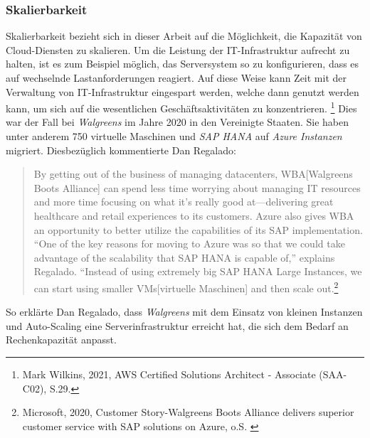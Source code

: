 \subsubsection{Skalierbarkeit}
Skalierbarkeit bezieht sich in dieser Arbeit auf die Möglichkeit, die Kapazität von Cloud-Diensten zu skalieren. Um die Leistung der IT-Infrastruktur aufrecht zu halten, ist es zum Beispiel möglich, das Serversystem so zu konfigurieren, dass es auf wechselnde Lastanforderungen reagiert.
%
Auf diese Weise kann Zeit mit der Verwaltung von IT-Infrastruktur eingespart werden, welche dann genutzt werden kann, um sich auf die wesentlichen Geschäftsaktivitäten zu konzentrieren.
\footnote{Mark Wilkins, 2021, AWS Certified Solutions Architect - Associate (SAA-C02), S.29.\cite{AWS1}}
Dies war der Fall bei \textit{Walgreens} im Jahre 2020 in den Vereinigte Staaten.
Sie haben unter anderem 750 virtuelle Maschinen und \textit{SAP HANA} auf \textit{Azure Instanzen} migriert.
Diesbezüglich kommentierte Dan Regalado:
\begin{quote}
      By getting out of the business of managing datacenters, WBA[Walgreens Boots Alliance] can spend less time worrying about managing IT resources and more time focusing on what it’s really good at—delivering great healthcare and retail experiences to its customers. Azure also gives WBA an opportunity to better utilize the capabilities of its SAP implementation. “One of the key reasons for moving to Azure was so that we could take advantage of the scalability that SAP HANA is capable of,” explains Regalado. “Instead of using extremely big SAP HANA Large Instances, we can start using smaller VMs[virtuelle Maschinen] and then scale out.\footnote{Microsoft, 2020, Customer Story-Walgreens Boots Alliance delivers superior customer service with SAP solutions on Azure, o.S. \cite{AZU01}}
\end{quote}
So erklärte Dan Regalado, dass \textit{Walgreens} mit dem Einsatz von kleinen Instanzen und Auto-Scaling eine Serverinfrastruktur erreicht hat, die sich dem Bedarf an Rechenkapazität anpasst. 

